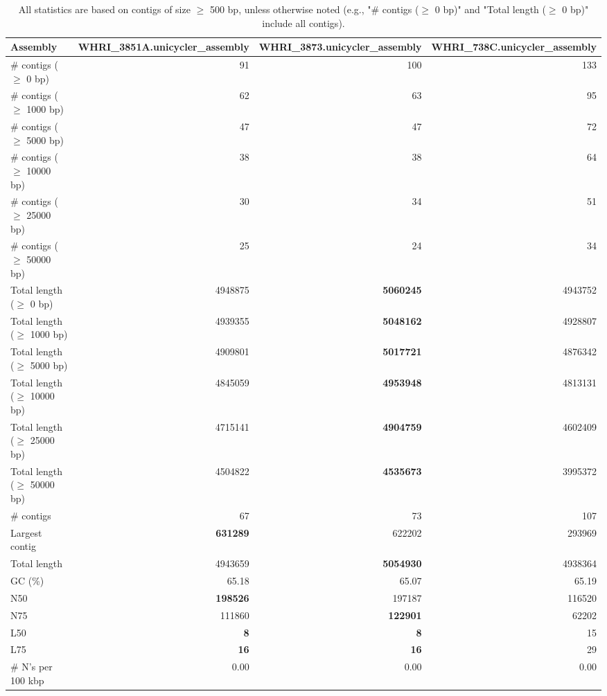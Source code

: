 \documentclass[12pt,a4paper]{article}
\begin{document}
\begin{table}[ht]
\begin{center}
\caption{All statistics are based on contigs of size $\geq$ 500 bp, unless otherwise noted (e.g., "\# contigs ($\geq$ 0 bp)" and "Total length ($\geq$ 0 bp)" include all contigs).}
\begin{tabular}{|l*{3}{|r}|}
\hline
Assembly & WHRI\_3851A.unicycler\_assembly & WHRI\_3873.unicycler\_assembly & WHRI\_738C.unicycler\_assembly \\ \hline
\# contigs ($\geq$ 0 bp) & 91 & 100 & 133 \\ \hline
\# contigs ($\geq$ 1000 bp) & 62 & 63 & 95 \\ \hline
\# contigs ($\geq$ 5000 bp) & 47 & 47 & 72 \\ \hline
\# contigs ($\geq$ 10000 bp) & 38 & 38 & 64 \\ \hline
\# contigs ($\geq$ 25000 bp) & 30 & 34 & 51 \\ \hline
\# contigs ($\geq$ 50000 bp) & 25 & 24 & 34 \\ \hline
Total length ($\geq$ 0 bp) & 4948875 & {\bf 5060245} & 4943752 \\ \hline
Total length ($\geq$ 1000 bp) & 4939355 & {\bf 5048162} & 4928807 \\ \hline
Total length ($\geq$ 5000 bp) & 4909801 & {\bf 5017721} & 4876342 \\ \hline
Total length ($\geq$ 10000 bp) & 4845059 & {\bf 4953948} & 4813131 \\ \hline
Total length ($\geq$ 25000 bp) & 4715141 & {\bf 4904759} & 4602409 \\ \hline
Total length ($\geq$ 50000 bp) & 4504822 & {\bf 4535673} & 3995372 \\ \hline
\# contigs & 67 & 73 & 107 \\ \hline
Largest contig & {\bf 631289} & 622202 & 293969 \\ \hline
Total length & 4943659 & {\bf 5054930} & 4938364 \\ \hline
GC (\%) & 65.18 & 65.07 & 65.19 \\ \hline
N50 & {\bf 198526} & 197187 & 116520 \\ \hline
N75 & 111860 & {\bf 122901} & 62202 \\ \hline
L50 & {\bf 8} & {\bf 8} & 15 \\ \hline
L75 & {\bf 16} & {\bf 16} & 29 \\ \hline
\# N's per 100 kbp & 0.00 & 0.00 & 0.00 \\ \hline
\end{tabular}
\end{center}
\end{table}
\end{document}

